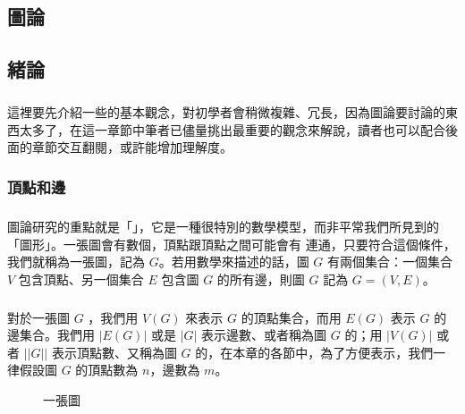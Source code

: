 \documentclass[12pt,a4paper,oneside]{report}
\begin{document}
\begin{CJK}{UTF8}{bkai}
\fi

\providecommand*{\UEdge}[2]{\ensuremath{({#1},{#2})}}
\providecommand*{\DEdge}[2]{\ensuremath{\langle{}{{#1},{#2}}\rangle{}}}
\providecommand*{\Deg}[2][G]{\ensuremath{d_{#1}{(#2)}}}
\providecommand*{\OutDeg}[2][G]{\ensuremath{d^{+}_{#1}{(#2)}}}
\providecommand*{\InDeg}[2][G]{\ensuremath{d^{-}_{#1}{(#2)}}}
\chapter{圖論}

\section{緒論}
\paragraph{}這裡要先介紹一些的基本觀念，對初學者會稍微複雜、冗長，因為圖論要討論的東西太多了，在這一章節中筆者已儘量挑出最重要的觀念來解說，讀者也可以配合後面的章節交互翻閱，或許能增加理解度。

\subsection{頂點和邊}
\paragraph{}圖論研究的重點就是「\textbf{}」，它是一種很特別的數學模型，而非平常我們所見到的「圖形」。一張圖會有數個\textbf{}，頂點跟頂點之間可能會有\textbf{} 連通，只要符合這個條件，我們就稱為一張圖，記為 $G$。若用數學來描述的話，圖 $G$ 有兩個集合：一個集合 $V$ 包含頂點、另一個集合 $E$ 包含圖 $G$ 的所有邊，則圖 $G$ 記為 $G=(V,E)$。
\paragraph{}對於一張圖 $G$ ，我們用 $V(G)$ 來表示 $G$ 的頂點集合，而用 $E(G)$ 表示 $G$ 的邊集合。我們用 $|E(G)|$ 或是 $|G|$ 表示邊數、或者稱為圖 $G$ 的；用 $|V(G)|$ 或者 $||G||$ 表示頂點數、又稱為圖 $G$ 的，在本章的各節中，為了方便表示，我們一律假設圖 $G$ 的頂點數為 $n$，邊數為 $m$。
\begin{figure}[h!]
\centering
\label{fig-a-graph}
\caption{一張圖}
\end{figure}


\end{CJK}
\end{document}

